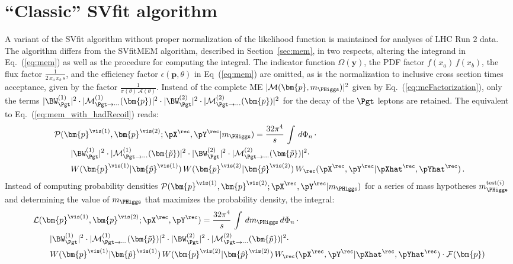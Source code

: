 \section{``Classic'' SVfit algorithm}
\label{sec:classicSVfit}

A variant of the SVfit algorithm without proper normalization of the likelihood function is maintained for analyses of LHC Run $2$ data.
The algorithm differs from the SVfitMEM algorithm, described in Section~\ref{sec:mem}, in two respects,
altering the integrand in Eq.~(\ref{eq:mem}) as well as the procedure for computing the integral.
The indicator function $\Omega(\bm{y})$, the PDF factor $f(x_{a}) \, f(x_{b})$, the flux factor $\frac{1}{2 \, x_{a} \, x_{b} \, s}$,
and the efficiency factor $\epsilon(\bm{p},\theta)$ in Eq~(\ref{eq:mem}) are omitted,
as is the normalization to inclusive cross section times acceptance, given by the factor $\frac{1}{\sigma(\theta) \, \mathcal{A}(\theta)}$.
Instead of the complete ME $\vert \mathcal{M}(\bm{p},m_{\PHiggs}) \vert^{2}$ given by Eq.~(\ref{eq:meFactorization}),
only the terms 
$\vert \BW_{\Pgt}^{(1)} \vert^{2} \cdot \vert \mathcal{M}^{(1)}_{\Pgt\to\cdots}(\bm{p}) \vert^{2} \cdot \vert \BW_{\Pgt}^{(2)} \vert^{2} \cdot \vert \mathcal{M}^{(2)}_{\Pgt\to\cdots}(\bm{p}) \vert^{2}$
for the decay of the $\Pgt$ leptons are retained.
The equivalent to Eq.~(\ref{eq:mem_with_hadRecoil}) reads:
\begin{align}
&
\mathcal{P}(\bm{p}^{\vis(1)},\bm{p}^{\vis(2)};\pX^{\rec},\pY^{\rec}|m_{\PHiggs})
= \frac{32\pi^{4}}{s} \, \int \, d\Phi_{n} \, \cdot \hspace{2cm} \nonumber \\
& \qquad \vert \BW^{(1)}_{\Pgt} \vert^{2} \cdot \vert \mathcal{M}^{(1)}_{\Pgt\to\cdots}(\bm{\tilde{p}}) \vert^{2} 
 \cdot \vert \BW^{(2)}_{\Pgt} \vert^{2} \cdot \vert \mathcal{M}^{(2)}_{\Pgt\to\cdots}(\bm{\tilde{p}}) \vert^{2} \cdot \nonumber \\
& \qquad W(\bm{p}^{\vis(1)}|\bm{\hat{p}}^{\vis(1)}) \, W(\bm{p}^{\vis(2)}|\bm{\hat{p}}^{\vis(2)}) \, W_{\rec}( \pX^{\rec},\pY^{\rec} | \pXhat^{\rec},\pYhat^{\rec} ) \, .
\label{eq:likelihood_with_hadRecoil}
\end{align}
Instead of computing probability densities $\mathcal{P}(\bm{p}^{\vis(1)},\bm{p}^{\vis(2)};\pX^{\rec},\pY^{\rec}|m_{\PHiggs})$ for a series of mass hypotheses $m_{\PHiggs}^{\textrm{test}(i)}$ 
and determining the value of $m_{\PHiggs}$ that maximizes the probability density,
the integral:
\begin{align}
& \mathcal{L}(\bm{p}^{\vis(1)},\bm{p}^{\vis(2)};\pX^{\rec},\pY^{\rec}) 
= \frac{32\pi^{4}}{s} \, \int \, dm_{\PHiggs} \, d\Phi_{n} \, \cdot \hspace{2cm} \nonumber \\
& \qquad \vert \BW^{(1)}_{\Pgt} \vert^{2} \cdot \vert \mathcal{M}^{(1)}_{\Pgt\to\cdots}(\bm{\tilde{p}}) \vert^{2} 
 \cdot \vert \BW^{(2)}_{\Pgt} \vert^{2} \cdot \vert \mathcal{M}^{(2)}_{\Pgt\to\cdots}(\bm{\tilde{p}}) \vert^{2} \cdot \nonumber \\
& \qquad W(\bm{p}^{\vis(1)}|\bm{\hat{p}}^{\vis(1)}) \, W(\bm{p}^{\vis(2)}|\bm{\hat{p}}^{\vis(2)}) \, W_{\rec}( \pX^{\rec},\pY^{\rec} | \pXhat^{\rec},\pYhat^{\rec} ) \cdot \mathcal{F}(\bm{p}) 
\label{eq:cSVfit_with_hadRecoil}
\end{align}
